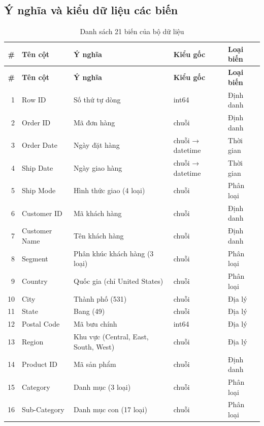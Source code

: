 \documentclass[12pt,a4paper]{article}
\begin{document}
\subsection{Ý nghĩa và kiểu dữ liệu các biến}
\begin{longtable}{@{}r l p{5.6cm} l l@{}}
\caption{Danh sách 21 biến của bộ dữ liệu}\label{tab:bien}\\
\toprule
\textbf{\#} & \textbf{Tên cột} & \textbf{Ý nghĩa} & \textbf{Kiểu gốc} & \textbf{Loại biến} \\
\midrule
\endfirsthead
\toprule
\textbf{\#} & \textbf{Tên cột} & \textbf{Ý nghĩa} & \textbf{Kiểu gốc} & \textbf{Loại biến} \\
\midrule
\endhead
1  & Row ID        & Số thứ tự dòng                       & int64   & Định danh \\
2  & Order ID      & Mã đơn hàng                          & chuỗi   & Định danh \\
3  & Order Date    & Ngày đặt hàng                        & chuỗi → datetime & Thời gian \\
4  & Ship Date     & Ngày giao hàng                       & chuỗi → datetime & Thời gian \\
5  & Ship Mode     & Hình thức giao (4 loại)              & chuỗi   & Phân loại \\
6  & Customer ID   & Mã khách hàng                        & chuỗi   & Định danh \\
7  & Customer Name & Tên khách hàng                       & chuỗi   & Định danh \\
8  & Segment       & Phân khúc khách hàng (3 loại)        & chuỗi   & Phân loại \\
9  & Country       & Quốc gia (chỉ United States)         & chuỗi   & Phân loại \\
10 & City          & Thành phố (531)                      & chuỗi   & Địa lý \\
11 & State         & Bang (49)                            & chuỗi   & Địa lý \\
12 & Postal Code   & Mã bưu chính                         & int64   & Địa lý \\
13 & Region        & Khu vực (Central, East, South, West) & chuỗi   & Địa lý \\
14 & Product ID    & Mã sản phẩm                          & chuỗi   & Định danh \\
15 & Category      & Danh mục (3 loại)                    & chuỗi   & Phân loại \\
16 & Sub-Category  & Danh mục con (17 loại)               & chuỗi   & Phân loại \\

\end{longtable}
\end{document}
